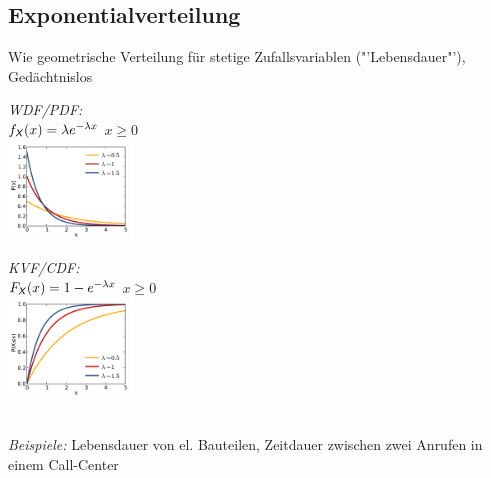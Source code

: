 \documentclass[6pt,a4paper]{scrartcl}
\begin{document}
\begin{multicols*}{4}
{			\subsection{Exponentialverteilung}
		Wie geometrische Verteilung für stetige Zufallsvariablen ("'Lebensdauer"'), Gedächtnislos\\[0.5em]
		\parbox{3.3cm}{\emph{WDF/PDF:}\\ $f_{\operatorname{\textsf{\textit{X}}}}(x) = \lambda e^{-\lambda x}$ \qquad$x \geq 0$\\ \includegraphics[width = 3.3cm]{./img/exponential_pdf.pdf}}
		\parbox{3.3cm}{\emph{KVF/CDF:} \\ $F_{\operatorname{\textsf{\textit{X}}}}(x) = 1-e^{-\lambda x}$ \qquad$x \geq 0$ \\ \includegraphics[width = 3.3cm]{./img/exponential_cdf.pdf}}\\
		\emph{Beispiele:} Lebensdauer von el. Bauteilen, Zeitdauer zwischen zwei Anrufen in einem Call-Center
		}

\end{multicols*}
\end{document}
